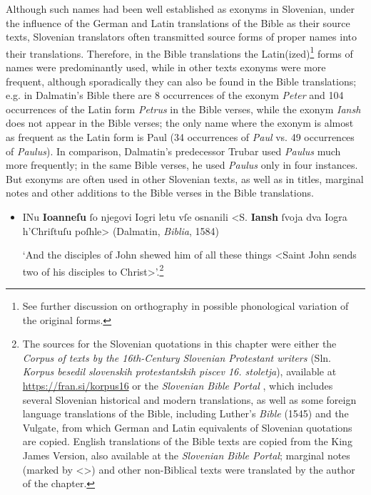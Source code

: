 \documentclass[output=paper,colorlinks,citecolor=brown,arabicfont,chinesefont]{langscibook}
\begin{document}
\largerpage
Although such names had been well established as exonyms in Slovenian, under the influence of the German and Latin translations of the Bible as their source texts, Slovenian translators often transmitted source forms of proper names into their translations. Therefore, in the Bible translations the Latin(ized)\footnote{See further discussion on orthography in possible phonological variation of the original forms.}    forms of names were predominantly used, while in other texts exonyms were more frequent, although sporadically they can also be found in the Bible translations; e.g. in Dalmatin’s Bible there are 8 occurrences of the exonym \emph{Peter} and 104 occurrences of the Latin form \emph{Petrus} in the Bible verses, while the exonym \emph{Iansh} does not appear in the Bible verses; the only name where the exonym is almost as frequent as the Latin form is Paul (34 occurrences of \emph{Paul} vs. 49 occurrences of \emph{Paulus}). In comparison, Dalmatin’s predecessor Trubar used \emph{Paulus} much more frequently; in the same Bible verses, he used \emph{Paulus} only in four instances.  But exonyms are often used in other Slovenian texts, as well as in titles, marginal notes and other additions to the Bible verses in the Bible translations. 

\begin{itemize}
    \item[(1)] INu \textbf{Ioanneſu} ſo njegovi Iogri letu vſe osnanili <S. \textbf{Iansh} ſvoja dva Iogra h'Chriſtuſu poſhle> (Dalmatin, \emph{Biblia}, 1584)
    
    ‘And the disciples of John shewed him of all these things <Saint John sends two of his disciples to Christ>’.\footnote{The sources for the Slovenian quotations in this chapter were either the \emph{Corpus of texts by the 16th-Century Slovenian Protestant writers} (Sln. \emph{Korpus besedil slovenskih protestantskih piscev 16. stoletja}), available at \url{https://fran.si/korpus16} or the \emph{Slovenian Bible Portal} \citep{[Biblija]}, which includes several Slovenian historical and modern translations, as well as some foreign language translations of the Bible, including Luther’s \emph{Bible} (1545) and the Vulgate, from which German and Latin equivalents of Slovenian quotations are copied. English translations of the Bible texts are copied from the King James Version, also available at the \emph{Slovenian Bible Portal}; marginal notes (marked by <>) and other non-Biblical texts were translated by the author of the chapter.}
\end{itemize}
\end{document}
